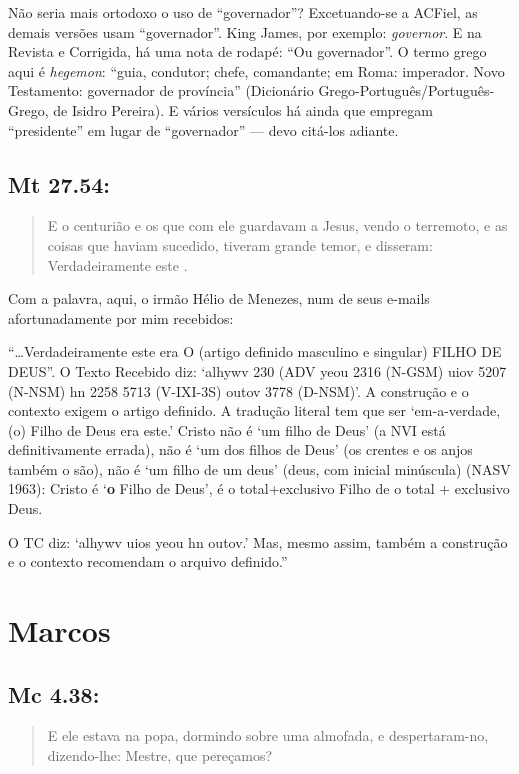 Não seria mais ortodoxo o uso de ``governador''? Excetuando-se a ACFiel, as demais versões usam ``governador''. King James, por exemplo: \emph{governor}. E na Revista e Corrigida, há uma nota de rodapé: ``Ou governador''. O termo grego aqui é \emph{hegemon}: ``guia, condutor; chefe, comandante; em Roma: imperador. Novo
Testamento: governador de província'' (Dicionário Grego-Português/Português-Grego, de Isidro Pereira). E vários versículos há ainda que empregam ``presidente'' em lugar de ``governador'' --- devo citá-los adiante.


\subsection*{Mt 27.54:}
\begin{quote}
 \small
 E o centurião e os que com ele guardavam a Jesus, vendo o terremoto, e as coisas que haviam sucedido, tiveram grande temor, e disseram: Verdadeiramente este .
\end{quote}

Com a palavra, aqui, o irmão Hélio de Menezes, num de seus e-mails afortunadamente por mim recebidos:

``\ldots Verdadeiramente este era O (artigo definido masculino e singular)
FILHO DE DEUS''. O Texto Recebido diz: `alhywv 230 (ADV yeou 2316 (N-GSM)
uiov 5207 (N-NSM) hn 2258 5713 (V-IXI-3S) outov 3778 (D-NSM)'. A
construção e o contexto exigem o artigo definido. A tradução literal tem
que ser `em-a-verdade, (o) Filho de Deus era este.' Cristo não é `um
filho de Deus' (a NVI está definitivamente errada), não é `um dos filhos
de Deus' (os crentes e os anjos também o são), não é `um filho de um
deus' (deus, com inicial minúscula) (NASV 1963): Cristo é `\textbf{o}
Filho de Deus', é o total+exclusivo Filho de o total $+$ exclusivo Deus.

O TC diz: `alhywv uios yeou hn outov.' Mas, mesmo assim, também a
construção e o contexto recomendam o arquivo definido.''

\section{Marcos}\label{seteda}
\subsection*{Mc 4.38:}
\begin{quote}
 \small
E ele estava na popa, dormindo sobre uma almofada, e despertaram-no, dizendo-lhe: Mestre,  que pereçamos?
\end{quote}

